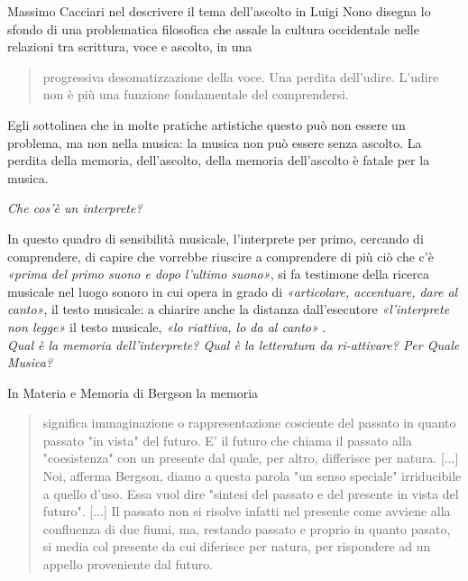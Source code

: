 \documentclass[a4paper,12pt]{article}
\begin{document}
Massimo Cacciari nel descrivere il tema dell'ascolto in Luigi Nono
\cite{Cacciari1995} disegna lo sfondo di una problematica filosofica che assale
la cultura occidentale nelle relazioni tra scrittura, voce e ascolto, %
in una

\begin{quote}
  progressiva desomatizzazione della voce. Una perdita dell'udire. L'udire
  non è più una funzione fondamentale del comprendersi. \cite{Cacciari1995}
\end{quote}

Egli sottolinea che in molte pratiche artistiche questo può non essere un
problema, ma non nella musica: la musica non può essere senza ascolto.
La perdita della memoria, dell'ascolto, della memoria dell'ascolto è fatale
per la musica. %

\emph{Che cos'è un interprete?}

In questo quadro di sensibilità musicale, l'interprete per primo, cercando di
comprendere, di capire che vorrebbe riuscire a comprendere di più ciò che c'è
\emph{«prima del primo suono e dopo l'ultimo suono»}, si fa testimone della
ricerca musicale nel luogo sonoro in cui opera in grado di
\emph{«articolare, accentuare, dare al canto»}, il testo musicale: a chiarire
anche la distanza dall'esecutore \emph{«l'interprete non legge»} il testo
musicale, \emph{«lo riattiva, lo da al canto»} \cite{Cacciari1995}.\\

\emph{Qual è la memoria dell'interprete? Qual è la letteratura da ri-attivare? Per Quale Musica?}

In Materia e Memoria di Bergson la memoria

\begin{quote}
  significa immaginazione o rappresentazione cosciente del passato in quanto passato
  "in vista" del futuro. E' il futuro che chiama il passato alla "coesistenza"
  con un presente dal quale, per altro, differisce per natura. [...] Noi, afferma Bergson,
  diamo a questa parola "un senso speciale" irriducibile a quello d'uso. Essa vuol dire
  "sintesi del passato e del presente in vista del futuro". [...] Il passato non si risolve
  infatti nel presente come avviene alla confluenza di due fiumi, ma, restando passato
  e proprio in quanto pasato, si media col presente da cui diferisce per natura, per rispondere
  ad un appello proveniente dal futuro. \cite{Ronchi1990}
\end{quote}
\end{document}
